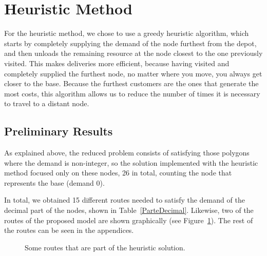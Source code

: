 \documentclass{amsart}
\begin{document}
        \section{Heuristic Method}\label{MetodoHeuristico}
        For the heuristic method, we chose to use a greedy heuristic algorithm, which starts by completely supplying the demand of the node furthest from the depot, and then unloads the remaining resource at the node closest to the one previously visited. This makes deliveries more efficient, because having visited and completely supplied the furthest node, no matter where you move, you always get closer to the base. Because the furthest customers are the ones that generate the most costs, this algorithm allows us to reduce the number of times it is necessary to travel to a distant node.
        
        \subsection{Preliminary Results}
        As explained above, the reduced problem consists of satisfying those polygons where the demand is non-integer, so the solution implemented with the heuristic method focused only on these nodes, 26 in total, counting the node that represents the base (demand 0).

        In total, we obtained 15 different routes needed to satisfy the demand of the decimal part of the nodes, shown in Table~\ref{ParteDecimal}. Likewise, two of the routes of the proposed model are shown graphically (see Figure~\ref{fig:RutasDeEjemplo}). The rest of the routes can be seen in the appendices.

        \begin{figure}[ht]
            \begin{center}
                \caption{Some routes that are part of the heuristic solution.}\label{fig:RutasDeEjemplo}
            \end{center}
        \end{figure}
        
\end{document}
